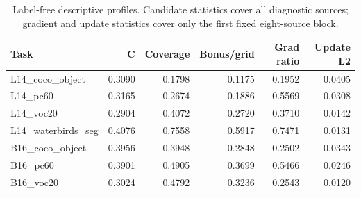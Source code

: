 \begin{table}[htbp]
\centering\scriptsize
\caption{Label-free descriptive profiles. Candidate statistics cover all diagnostic sources; gradient and update statistics cover only the first fixed eight-source block.}
\label{tab:transfer}
\setlength{\tabcolsep}{4pt}
\begin{tabular}{lrrrrr}
\toprule
Task & C & Coverage & Bonus/grid & Grad ratio & Update L2 \\
\midrule
L14\_coco\_object & 0.3090 & 0.1798 & 0.1175 & 0.1952 & 0.0405 \\
L14\_pc60 & 0.3165 & 0.2674 & 0.1886 & 0.5569 & 0.0308 \\
L14\_voc20 & 0.2904 & 0.4072 & 0.2720 & 0.3710 & 0.0142 \\
L14\_waterbirds\_seg & 0.4076 & 0.7558 & 0.5917 & 0.7471 & 0.0131 \\
B16\_coco\_object & 0.3956 & 0.3948 & 0.2848 & 0.2502 & 0.0343 \\
B16\_pc60 & 0.3901 & 0.4905 & 0.3699 & 0.5466 & 0.0246 \\
B16\_voc20 & 0.3024 & 0.4792 & 0.3236 & 0.2543 & 0.0120 \\
\bottomrule
\end{tabular}
\end{table}
